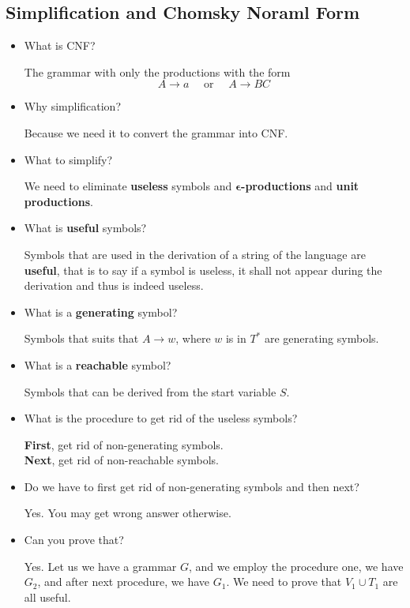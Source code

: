 \documentclass[../main.tex]{subfiles}
\begin{document}
\subsection{Simplification and Chomsky Noraml Form}
\begin{itemize}
\item 	What is CNF? 

The grammar with only the productions with the form 
\[
	A \to a \quad \text{ or } \quad A \to BC
\]
\item Why simplification? 

Because we need it to convert the grammar into CNF. 

\item What to simplify? 

We need to eliminate \textbf{useless} symbols and 
\(\boldsymbol{\epsilon}\)\textbf{-productions} and 
\textbf{unit productions}. 

\item What is \textbf{useful} symbols? 

Symbols that are used in the derivation of a string of the 
language are \textbf{useful}, that is to say if a symbol is 
useless, it shall not appear during the derivation and thus 
is indeed useless. 

\item What is a \textbf{generating} symbol? 

Symbols that suits that \(A \to w\), where \(w\) is in \(T^{*}\)
are generating symbols. 

\item What is a \textbf{reachable} symbol?

Symbols that can be derived from the start variable \(S\). 

\item What is the procedure to get rid of the 
useless symbols? 

\textbf{First}, get rid of non-generating symbols. \\
\textbf{Next}, get rid of non-reachable symbols.

\item Do we have to first get rid of non-generating symbols and then next? 

Yes. You may get wrong answer otherwise. 

\item Can you prove that? 

Yes. Let us we have a grammar \(G\), and we employ 
the procedure one, we have \(G _{2}\), and after 
next procedure, we have \(G_{1}\). We need to 
prove that \(V _{1} \cup T_{1} \) are all useful. 


\end{itemize}
\end{document}
